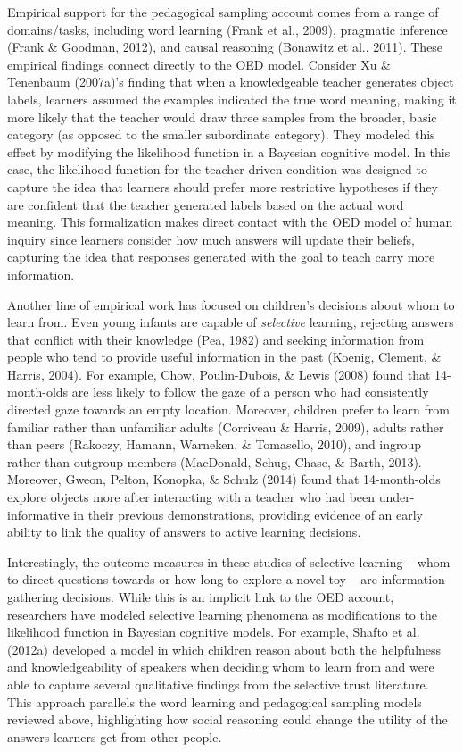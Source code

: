 \documentclass[oneside]{report}
\begin{document}
Empirical support for the pedagogical sampling account comes from a
range of domains/tasks, including word learning (Frank et al., 2009),
pragmatic inference (Frank \& Goodman, 2012), and causal reasoning
(Bonawitz et al., 2011). These empirical findings connect directly to
the OED model. Consider Xu \& Tenenbaum (2007a)'s finding that when a
knowledgeable teacher generates object labels, learners assumed the
examples indicated the true word meaning, making it more likely that the
teacher would draw three samples from the broader, basic category (as
opposed to the smaller subordinate category). They modeled this effect
by modifying the likelihood function in a Bayesian cognitive model. In
this case, the likelihood function for the teacher-driven condition was
designed to capture the idea that learners should prefer more
restrictive hypotheses if they are confident that the teacher generated
labels based on the actual word meaning. This formalization makes direct
contact with the OED model of human inquiry since learners consider how
much answers will update their beliefs, capturing the idea that
responses generated with the goal to teach carry more information.

Another line of empirical work has focused on children's decisions about
whom to learn from. Even young infants are capable of \emph{selective}
learning, rejecting answers that conflict with their knowledge (Pea,
1982) and seeking information from people who tend to provide useful
information in the past (Koenig, Clement, \& Harris, 2004). For example,
Chow, Poulin-Dubois, \& Lewis (2008) found that 14-month-olds are less
likely to follow the gaze of a person who had consistently directed gaze
towards an empty location. Moreover, children prefer to learn from
familiar rather than unfamiliar adults (Corriveau \& Harris, 2009),
adults rather than peers (Rakoczy, Hamann, Warneken, \& Tomasello,
2010), and ingroup rather than outgroup members (MacDonald, Schug,
Chase, \& Barth, 2013). Moreover, Gweon, Pelton, Konopka, \& Schulz
(2014) found that 14-month-olds explore objects more after interacting
with a teacher who had been under-informative in their previous
demonstrations, providing evidence of an early ability to link the
quality of answers to active learning decisions.

Interestingly, the outcome measures in these studies of selective
learning -- whom to direct questions towards or how long to explore a
novel toy -- are information-gathering decisions. While this is an
implicit link to the OED account, researchers have modeled selective
learning phenomena as modifications to the likelihood function in
Bayesian cognitive models. For example, Shafto et al. (2012a) developed
a model in which children reason about both the helpfulness and
knowledgeability of speakers when deciding whom to learn from and were
able to capture several qualitative findings from the selective trust
literature. This approach parallels the word learning and pedagogical
sampling models reviewed above, highlighting how social reasoning could
change the utility of the answers learners get from other people.
\end{document}
